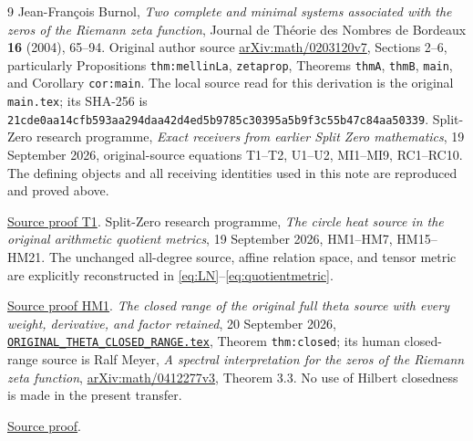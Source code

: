 \documentclass[11pt]{article}
\begin{document}
\begin{thebibliography}{9}
 Jean-Fran\c{c}ois Burnol,
\emph{Two complete and minimal systems associated with the zeros
of the Riemann zeta function}, Journal de Th\'eorie des Nombres
de Bordeaux \textbf{16} (2004), 65--94.
Original author source \href{https://arxiv.org/abs/math/0203120v7}
{arXiv:math/0203120v7}, Sections 2--6, particularly
Propositions \texttt{thm:mellinLa}, \texttt{zetaprop},
Theorems \texttt{thmA}, \texttt{thmB}, \texttt{main}, and
Corollary \texttt{cor:main}. The local source read for this
derivation is the original \texttt{main.tex}; its SHA-256 is
\texttt{21cde0aa14cfb593aa294daa42d4ed5b9785c30395a5b9f3c55b47c84aa50339}.
 Split-Zero research programme,
\emph{Exact receivers from earlier Split Zero mathematics},
19 September 2026, original-source equations T1--T2, U1--U2,
MI1--MI9, RC1--RC10. The defining objects and all receiving
identities used in this note are reproduced and proved above.

\href{https://github.com/KokunoYumeto/zeta-function-research-reader/blob/5992ad50c0f2a06921f1fcaded7b4e38097c0739/workbenches/splitzero-tandem/continuations/20260920-original-kernel-mixed-determinants/providers/EXACT_CORPUS_RECEIVERS.tex\#L334}{Source proof T1}.
 Split-Zero research programme,
\emph{The circle heat source in the original arithmetic quotient
metrics}, 19 September 2026, HM1--HM7, HM15--HM21.
The unchanged all-degree source, affine relation space, and
tensor metric are explicitly reconstructed in
\eqref{eq:LN}--\eqref{eq:quotientmetric}.

\href{https://github.com/KokunoYumeto/zeta-function-research-reader/blob/5992ad50c0f2a06921f1fcaded7b4e38097c0739/workbenches/splitzero-tandem/continuations/20260920-original-kernel-mixed-determinants/providers/HEAT_TO_ORIGINAL_QUOTIENT_METRICS.tex\#L31}{Source proof HM1}.
 \emph{The closed range of the original full
theta source with every weight, derivative, and factor retained},
20 September 2026, \href{https://github.com/KokunoYumeto/zeta-function-research-reader/blob/5992ad50c0f2a06921f1fcaded7b4e38097c0739/workbenches/splitzero-tandem/continuations/20260920-original-kernel-mixed-determinants/providers/ORIGINAL_THETA_CLOSED_RANGE.tex\#L1}{\texttt{ORIGINAL\_THETA\_CLOSED\_RANGE.tex}},
Theorem \texttt{thm:closed}; its human closed-range source is
Ralf Meyer, \emph{A spectral interpretation for the zeros of the
Riemann zeta function}, \href{https://arxiv.org/abs/math/0412277v3}
{arXiv:math/0412277v3}, Theorem 3.3. No use of Hilbert closedness
is made in the present transfer.

\href{https://github.com/KokunoYumeto/zeta-function-research-reader/blob/5992ad50c0f2a06921f1fcaded7b4e38097c0739/workbenches/splitzero-tandem/continuations/20260920-original-kernel-mixed-determinants/providers/ORIGINAL_THETA_CLOSED_RANGE.tex\#L1}{Source proof}.
\end{thebibliography}
\end{document}

